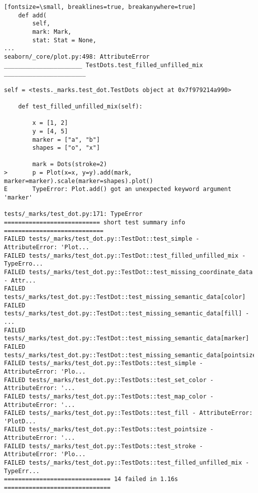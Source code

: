 \begin{verbatim}[fontsize=\small, breaklines=true, breakanywhere=true]
    def add(
        self,
        mark: Mark,
        stat: Stat = None,
...
seaborn/_core/plot.py:498: AttributeError
______________________ TestDots.test_filled_unfilled_mix _______________________

self = <tests._marks.test_dot.TestDots object at 0x7f979214a990>

    def test_filled_unfilled_mix(self):
    
        x = [1, 2]
        y = [4, 5]
        marker = ["a", "b"]
        shapes = ["o", "x"]
    
        mark = Dots(stroke=2)
>       p = Plot(x=x, y=y).add(mark, marker=marker).scale(marker=shapes).plot()
E       TypeError: Plot.add() got an unexpected keyword argument 'marker'

tests/_marks/test_dot.py:171: TypeError
=========================== short test summary info ============================
FAILED tests/_marks/test_dot.py::TestDot::test_simple - AttributeError: 'Plot...
FAILED tests/_marks/test_dot.py::TestDot::test_filled_unfilled_mix - TypeErro...
FAILED tests/_marks/test_dot.py::TestDot::test_missing_coordinate_data - Attr...
FAILED tests/_marks/test_dot.py::TestDot::test_missing_semantic_data[color]
FAILED tests/_marks/test_dot.py::TestDot::test_missing_semantic_data[fill] - ...
FAILED tests/_marks/test_dot.py::TestDot::test_missing_semantic_data[marker]
FAILED tests/_marks/test_dot.py::TestDot::test_missing_semantic_data[pointsize]
FAILED tests/_marks/test_dot.py::TestDots::test_simple - AttributeError: 'Plo...
FAILED tests/_marks/test_dot.py::TestDots::test_set_color - AttributeError: '...
FAILED tests/_marks/test_dot.py::TestDots::test_map_color - AttributeError: '...
FAILED tests/_marks/test_dot.py::TestDots::test_fill - AttributeError: 'PlotD...
FAILED tests/_marks/test_dot.py::TestDots::test_pointsize - AttributeError: '...
FAILED tests/_marks/test_dot.py::TestDots::test_stroke - AttributeError: 'Plo...
FAILED tests/_marks/test_dot.py::TestDots::test_filled_unfilled_mix - TypeErr...
============================== 14 failed in 1.16s ==============================
\end{verbatim}



